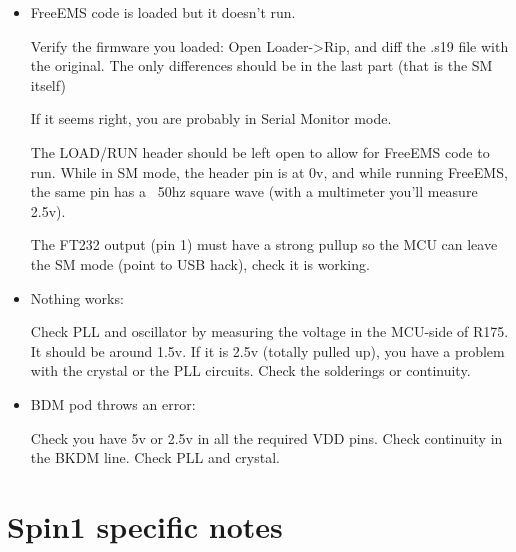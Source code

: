 \documentclass[12pt,a4paper,titlepage]{article}
\begin{document}
\begin{itemize}
 \item FreeEMS code is loaded but it doesn't run.

Verify the firmware you loaded:
Open Loader-\textgreater Rip, and diff the .s19 file with the original. The only differences should be in the last part (that is the SM itself)

If it seems right, you are probably in Serial Monitor mode.

The LOAD/RUN header should be left open to allow for FreeEMS code to run. While in SM mode, the header pin is at 0v, and while running FreeEMS, the same pin has a ~50hz square wave (with a multimeter you'll measure 2.5v). %

The FT232 output (pin 1) must have a strong pullup so the MCU can leave the SM mode (point to USB hack), check it is working.

 \item Nothing works:

Check PLL and oscillator by measuring the voltage in the MCU-side of R175. It should be around 1.5v. If it is 2.5v (totally pulled up), you have a problem with the crystal or the PLL circuits. Check the solderings or continuity.
 \item BDM pod throws an error:

Check you have 5v or 2.5v in all the required VDD pins. Check continuity in the BKDM line. Check PLL and crystal.


\end{itemize}


\section{Spin1 specific notes}
\end{document}
